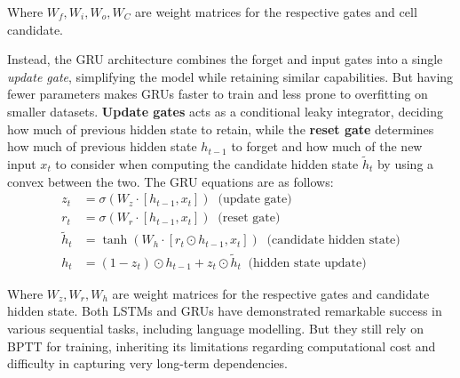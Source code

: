 Where $W_f, W_i, W_o, W_C$ are weight matrices for the respective gates and cell candidate.

Instead, the GRU architecture combines the forget and input gates into a single \textit{update gate}, simplifying the model while retaining similar capabilities. 
But having fewer parameters makes GRUs faster to train and less prone to overfitting on smaller datasets.
\textbf{Update gates} acts as a conditional leaky integrator, deciding how much of previous hidden state to retain, 
while the \textbf{reset gate} determines how much of previous hidden state $h_{t-1}$ to forget and how much of the new
input $x_t$ to consider when computing the candidate hidden state $\tilde{h}_t$ by using a convex between the two.
The GRU equations are as follows:
\begin{equation}
    \begin{split}
        z_t &= \sigma(W_z \cdot [h_{t-1}, x_t]) \;\; \text{(update gate)}\\
        r_t &= \sigma(W_r \cdot [h_{t-1}, x_t]) \;\; \text{(reset gate)}\\
        \tilde{h}_t &= \tanh(W_h \cdot [r_t \odot h_{t-1}, x_t]) \;\; \text{(candidate hidden state)}\\
        h_t &= (1 - z_t) \odot h_{t-1} + z_t \odot \tilde{h}_t \;\; \text{(hidden state update)}
    \end{split}
\end{equation}


Where $W_z, W_r, W_h$ are weight matrices for the respective gates and candidate hidden state.\newline\newline
Both LSTMs and GRUs have demonstrated remarkable success in various sequential tasks, including language modelling.
 But they still rely on BPTT for training, inheriting its limitations regarding computational cost 
 and difficulty in capturing very long-term dependencies.


